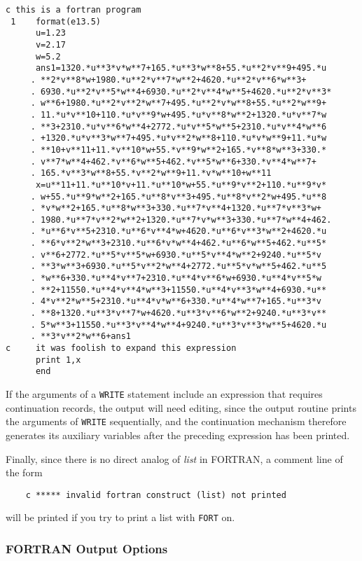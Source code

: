 {\small
\begin{verbatim}
c this is a fortran program
 1    format(e13.5)
      u=1.23
      v=2.17
      w=5.2
      ans1=1320.*u**3*v*w**7+165.*u**3*w**8+55.*u**2*v**9+495.*u
     . **2*v**8*w+1980.*u**2*v**7*w**2+4620.*u**2*v**6*w**3+
     . 6930.*u**2*v**5*w**4+6930.*u**2*v**4*w**5+4620.*u**2*v**3*
     . w**6+1980.*u**2*v**2*w**7+495.*u**2*v*w**8+55.*u**2*w**9+
     . 11.*u*v**10+110.*u*v**9*w+495.*u*v**8*w**2+1320.*u*v**7*w
     . **3+2310.*u*v**6*w**4+2772.*u*v**5*w**5+2310.*u*v**4*w**6
     . +1320.*u*v**3*w**7+495.*u*v**2*w**8+110.*u*v*w**9+11.*u*w
     . **10+v**11+11.*v**10*w+55.*v**9*w**2+165.*v**8*w**3+330.*
     . v**7*w**4+462.*v**6*w**5+462.*v**5*w**6+330.*v**4*w**7+
     . 165.*v**3*w**8+55.*v**2*w**9+11.*v*w**10+w**11
      x=u**11+11.*u**10*v+11.*u**10*w+55.*u**9*v**2+110.*u**9*v*
     . w+55.*u**9*w**2+165.*u**8*v**3+495.*u**8*v**2*w+495.*u**8
     . *v*w**2+165.*u**8*w**3+330.*u**7*v**4+1320.*u**7*v**3*w+
     . 1980.*u**7*v**2*w**2+1320.*u**7*v*w**3+330.*u**7*w**4+462.
     . *u**6*v**5+2310.*u**6*v**4*w+4620.*u**6*v**3*w**2+4620.*u
     . **6*v**2*w**3+2310.*u**6*v*w**4+462.*u**6*w**5+462.*u**5*
     . v**6+2772.*u**5*v**5*w+6930.*u**5*v**4*w**2+9240.*u**5*v
     . **3*w**3+6930.*u**5*v**2*w**4+2772.*u**5*v*w**5+462.*u**5
     . *w**6+330.*u**4*v**7+2310.*u**4*v**6*w+6930.*u**4*v**5*w
     . **2+11550.*u**4*v**4*w**3+11550.*u**4*v**3*w**4+6930.*u**
     . 4*v**2*w**5+2310.*u**4*v*w**6+330.*u**4*w**7+165.*u**3*v
     . **8+1320.*u**3*v**7*w+4620.*u**3*v**6*w**2+9240.*u**3*v**
     . 5*w**3+11550.*u**3*v**4*w**4+9240.*u**3*v**3*w**5+4620.*u
     . **3*v**2*w**6+ans1
c     it was foolish to expand this expression
      print 1,x
      end
\end{verbatim}
}
If the arguments of a {\tt WRITE} statement include an expression that
requires continuation records, the output will need editing, since the
output routine prints the arguments of {\tt WRITE} sequentially, and the
continuation mechanism therefore generates its auxiliary variables after
the preceding expression has been printed.

Finally, since there is no direct analog of {\em list\/} in FORTRAN,
a comment line of the form
\begin{verbatim}
	c ***** invalid fortran construct (list) not printed
\end{verbatim}
will be printed if you try to print a list with {\tt FORT} on.

\subsubsection{{FORTRAN} Output Options}


